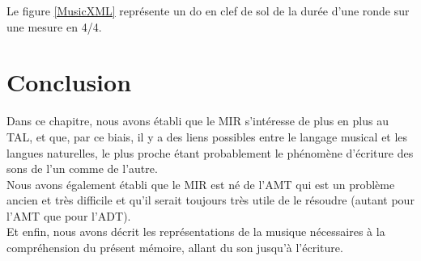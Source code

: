 Le figure \ref{MusicXML} représente un do en clef de sol de la durée d’une ronde sur une mesure en 4/4.


\section*{Conclusion}
Dans ce chapitre, nous avons établi que le MIR s’intéresse de plus en plus au TAL, et que, par ce biais, il y a des liens possibles entre le langage musical et les langues naturelles, le plus proche étant probablement le phénomène d’écriture des sons de l’un comme de l’autre.\\
Nous avons également établi que le MIR est né de l’AMT qui est un problème ancien et très difficile et qu’il serait toujours très utile de le résoudre (autant pour l’AMT que pour l’ADT).\\
Et enfin, nous avons décrit les représentations de la musique nécessaires à la compréhension du présent mémoire, allant du son jusqu’à l’écriture.
